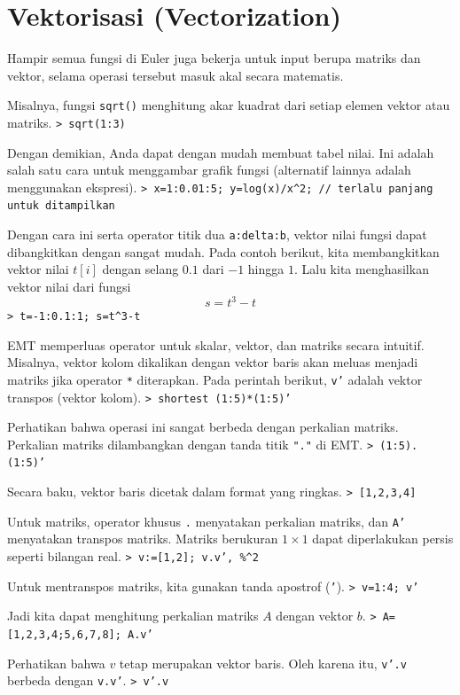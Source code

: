 \documentclass[11pt, a4paper]{article}
\newcommand{\emtcmd}[1]{\noindent\texttt{\textcolor{emtcommand}{>}\ #1}\par\smallskip}
\begin{document}
\section*{Vektorisasi (Vectorization)}

Hampir semua fungsi di Euler juga bekerja untuk input berupa matriks dan vektor, selama operasi tersebut masuk akal secara matematis.

Misalnya, fungsi \texttt{sqrt()} menghitung akar kuadrat dari setiap elemen vektor atau matriks.
\emtcmd{sqrt(1:3)}

Dengan demikian, Anda dapat dengan mudah membuat tabel nilai. Ini adalah salah satu cara untuk menggambar grafik fungsi (alternatif lainnya adalah menggunakan ekspresi).
\emtcmd{x=1:0.01:5; y=log(x)/x\^{}2; \textcolor{emtcomment}{// terlalu panjang untuk ditampilkan}}

Dengan cara ini serta operator titik dua \texttt{a:delta:b}, vektor nilai fungsi dapat dibangkitkan dengan sangat mudah. Pada contoh berikut, kita membangkitkan vektor nilai $t[i]$ dengan selang $0.1$ dari $-1$ hingga $1$. Lalu kita menghasilkan vektor nilai dari fungsi
$$s = t^3-t$$
\emtcmd{t=-1:0.1:1; s=t\^{}3-t}

EMT memperluas operator untuk skalar, vektor, dan matriks secara intuitif. Misalnya, vektor kolom dikalikan dengan vektor baris akan meluas menjadi matriks jika operator \texttt{*} diterapkan. Pada perintah berikut, \texttt{v'} adalah vektor transpos (vektor kolom).
\emtcmd{shortest (1:5)*(1:5)'}

Perhatikan bahwa operasi ini sangat berbeda dengan perkalian matriks. Perkalian matriks dilambangkan dengan tanda titik \texttt{"."} di EMT.
\emtcmd{(1:5).(1:5)'}

Secara baku, vektor baris dicetak dalam format yang ringkas.
\emtcmd{[1,2,3,4]}

Untuk matriks, operator khusus \texttt{.} menyatakan perkalian matriks, dan \texttt{A'} menyatakan transpos matriks. Matriks berukuran $1 \times 1$ dapat diperlakukan persis seperti bilangan real.
\emtcmd{v:=[1,2]; v.v', \%\^{}2}

Untuk mentranspos matriks, kita gunakan tanda apostrof (\texttt{'}).
\emtcmd{v=1:4; v'}

Jadi kita dapat menghitung perkalian matriks $A$ dengan vektor $b$.
\emtcmd{A=[1,2,3,4;5,6,7,8]; A.v'}

Perhatikan bahwa $v$ tetap merupakan vektor baris. Oleh karena itu, \texttt{v'.v} berbeda dengan \texttt{v.v'}.
\emtcmd{v'.v}
\end{document}
